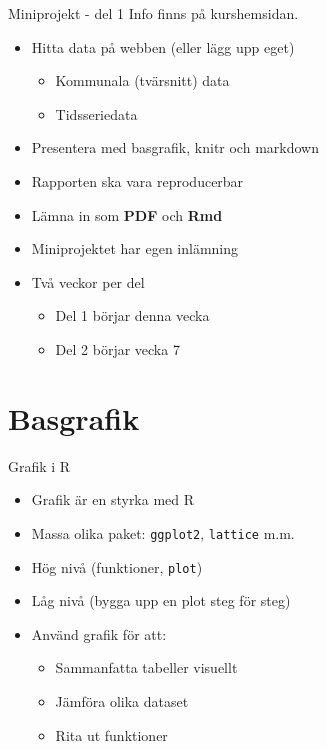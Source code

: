 \documentclass[
  11pt,
  ignorenonframetext,
  handout]{beamer}
\providecommand{\tightlist}{%
  \setlength{\itemsep}{0pt}\setlength{\parskip}{0pt}}
\newcommand\imp[1]{\alert{\textbf{#1}}}
\begin{document}
\begin{frame}{Miniprojekt - del 1}
\protect\hypertarget{miniprojekt---del-1}{}
Info finns på kurshemsidan.

\begin{itemize}
\tightlist
\item
  Hitta data på webben (eller lägg upp eget)

  \begin{itemize}
  \tightlist
  \item
    Kommunala (tvärsnitt) data
  \item
    Tidsseriedata
  \end{itemize}
\item
  Presentera med basgrafik, knitr och markdown
\item
  Rapporten ska vara reproducerbar
\item
  Lämna in som \imp{PDF} och \imp{Rmd}
\item
  Miniprojektet har egen inlämning
\item
  Två veckor per del

  \begin{itemize}
  \tightlist
  \item
    Del 1 börjar denna vecka
  \item
    Del 2 börjar vecka 7
  \end{itemize}
\end{itemize}
\end{frame}

\hypertarget{basgrafik}{%
\section{Basgrafik}\label{basgrafik}}

\begin{frame}{Grafik i R}
\protect\hypertarget{grafik-i-r}{}
\begin{itemize}
\tightlist
\item
  Grafik är en styrka med R
\item
  Massa olika paket: \texttt{ggplot2}, \texttt{lattice} m.m.
\item
  Hög nivå (funktioner, \texttt{plot})
\item
  Låg nivå (bygga upp en plot steg för steg)
\item
  Använd grafik för att:

  \begin{itemize}
  \tightlist
  \item
    Sammanfatta tabeller visuellt
  \item
    Jämföra olika dataset
  \item
    Rita ut funktioner
  \end{itemize}
\end{itemize}
\end{frame}
\end{document}
